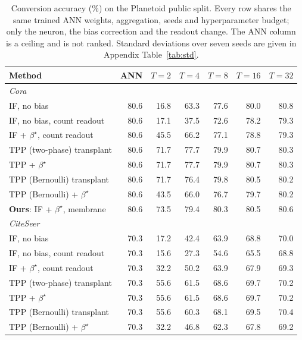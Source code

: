 \begin{table}[t]
\centering
\small
\caption{Conversion accuracy (\%) on the Planetoid public split. Every row shares the
same trained ANN weights, aggregation, seeds and hyperparameter budget; only the neuron,
the bias correction and the readout change. The ANN column is a ceiling and is not ranked.
Standard deviations over seven seeds are given in Appendix Table~\ref{tab:std}.}
\label{tab:main}
\begin{tabular}{lrrrrrr}
\toprule
Method & ANN & $T{=}2$ & $T{=}4$ & $T{=}8$ & $T{=}16$ & $T{=}32$ \\
\midrule
\multicolumn{7}{l}{\emph{Cora}} \\
IF, no bias & 80.6 & 16.8 & 63.3 & 77.6 & 80.0 & 80.8 \\
IF, no bias, count readout & 80.6 & 17.1 & 37.5 & 72.6 & 78.2 & 79.3 \\
IF + $\beta^\star$, count readout & 80.6 & 45.5 & 66.2 & 77.1 & 78.8 & 79.3 \\
TPP (two-phase) transplant & 80.6 & 71.7 & 77.7 & 79.9 & 80.7 & 80.3 \\
TPP + $\beta^\star$ & 80.6 & 71.7 & 77.7 & 79.9 & 80.7 & 80.3 \\
TPP (Bernoulli) transplant & 80.6 & 71.7 & 76.4 & 79.8 & 80.5 & 80.2 \\
TPP (Bernoulli) + $\beta^\star$ & 80.6 & 43.5 & 66.0 & 76.7 & 79.7 & 80.2 \\
\textbf{Ours}: IF + $\beta^\star$, membrane & 80.6 & 73.5 & 79.4 & 80.3 & 80.5 & 80.6 \\
\midrule
\multicolumn{7}{l}{\emph{CiteSeer}} \\
IF, no bias & 70.3 & 17.2 & 42.4 & 63.9 & 68.8 & 70.0 \\
IF, no bias, count readout & 70.3 & 15.6 & 27.3 & 54.6 & 65.5 & 68.8 \\
IF + $\beta^\star$, count readout & 70.3 & 32.2 & 50.2 & 63.9 & 67.9 & 69.3 \\
TPP (two-phase) transplant & 70.3 & 55.6 & 61.5 & 68.6 & 69.7 & 70.2 \\
TPP + $\beta^\star$ & 70.3 & 55.6 & 61.5 & 68.6 & 69.7 & 70.2 \\
TPP (Bernoulli) transplant & 70.3 & 55.6 & 60.3 & 68.1 & 69.5 & 70.4 \\
TPP (Bernoulli) + $\beta^\star$ & 70.3 & 32.2 & 46.8 & 62.3 & 67.8 & 69.2 \\

\end{tabular}
\end{table}
